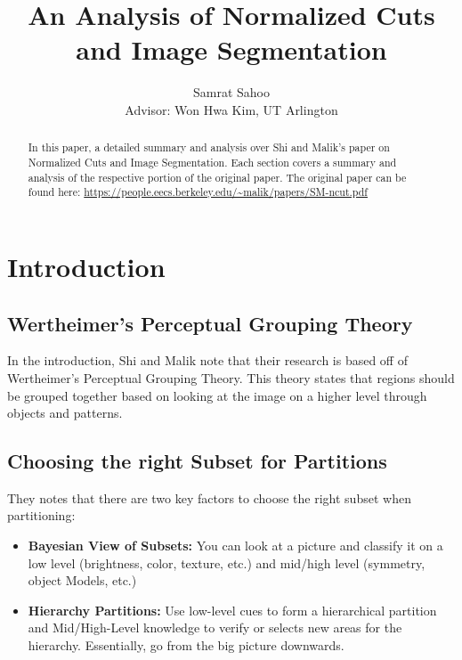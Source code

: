 \documentclass[letterpaper, 10 pt, conference]{ieeeconf}  %
\title{\LARGE \bf
An Analysis of Normalized Cuts and Image Segmentation
}
\author{Samrat Sahoo \\
        Advisor: Won Hwa Kim, UT Arlington}%
\begin{document}
\maketitle
\thispagestyle{empty}
\pagestyle{empty}


\begin{abstract}

In this paper, a detailed summary and analysis over Shi and Malik's paper on Normalized Cuts and Image Segmentation. Each section covers a summary and analysis of the respective portion of the original paper. The original paper can be found here: \color{navy}\url{https://people.eecs.berkeley.edu/~malik/papers/SM-ncut.pdf}
\color{black}
\end{abstract}


\section{Introduction}

\subsection{Wertheimer’s Perceptual Grouping Theory}
In the introduction, Shi and Malik note that their research is based off of Wertheimer’s Perceptual Grouping Theory. This theory states that regions should be grouped together based on looking at the image on a higher level through objects and patterns.

\subsection{Choosing the right Subset for Partitions}
They notes that there are two key factors to choose the right subset when partitioning:
\begin{itemize}

\item \textbf {Bayesian View of Subsets:} You  can look at a picture and classify it on a low level (brightness, color, texture, etc.) and mid/high level (symmetry, object Models, etc.)
\smallbreak
\item \textbf {Hierarchy Partitions:} Use low-level cues to form a hierarchical partition and Mid/High-Level knowledge to verify or selects new areas for the hierarchy. Essentially, go from the big picture downwards.
\end{itemize}
\end{document}
